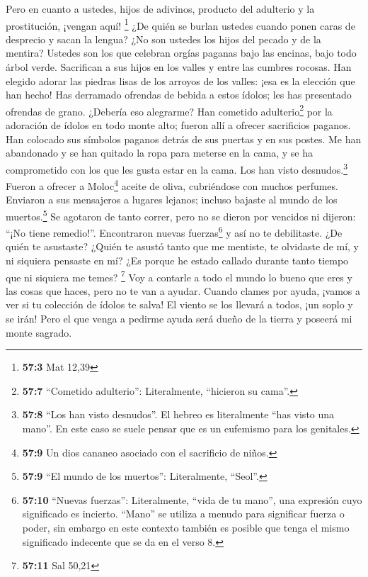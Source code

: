  Pero en cuanto a ustedes, hijos de adivinos, producto del
adulterio y la prostitución, ¡vengan aquí! \footnote{\textbf{57:3} Mat
  12,39}  ¿De quién se burlan ustedes cuando ponen caras
de desprecio y sacan la lengua? ¿No son ustedes los hijos del pecado y
de la mentira?  Ustedes son los que celebran orgías
paganas bajo las encinas, bajo todo árbol verde. Sacrifican a sus hijos
en los valles y entre las cumbres rocosas.  Han elegido
adorar las piedras lisas de los arroyos de los valles: ¡esa es la
elección que han hecho! Has derramado ofrendas de bebida a estos ídolos;
les has presentado ofrendas de grano. ¿Debería eso alegrarme?
 Han cometido adulterio\footnote{\textbf{57:7} ``Cometido
  adulterio'': Literalmente, ``hicieron su cama''.} por la adoración de
ídolos en todo monte alto; fueron allí a ofrecer sacrificios paganos.
 Han colocado sus símbolos paganos detrás de sus puertas y
en sus postes. Me han abandonado y se han quitado la ropa para meterse
en la cama, y se ha comprometido con los que les gusta estar en la cama.
Los han visto desnudos.\footnote{\textbf{57:8} ``Los han visto
  desnudos''. El hebreo es literalmente ``has visto una mano''. En este
  caso se suele pensar que es un eufemismo para los genitales.}
 Fueron a ofrecer a Moloc\footnote{\textbf{57:9} Un dios
  cananeo asociado con el sacrificio de niños.} aceite de oliva,
cubriéndose con muchos perfumes. Enviaron a sus mensajeros a lugares
lejanos; incluso bajaste al mundo de los muertos.\footnote{\textbf{57:9}
  ``El mundo de los muertos'': Literalmente, ``Seol''.} 
Se agotaron de tanto correr, pero no se dieron por vencidos ni dijeron:
``¡No tiene remedio!''. Encontraron nuevas fuerzas\footnote{\textbf{57:10}
  ``Nuevas fuerzas'': Literalmente, ``vida de tu mano'', una expresión
  cuyo significado es incierto. ``Mano'' se utiliza a menudo para
  significar fuerza o poder, sin embargo en este contexto también es
  posible que tenga el mismo significado indecente que se da en el verso
  8.} y así no te debilitaste.  ¿De quién te asustaste?
¿Quién te asustó tanto que me mentiste, te olvidaste de mí, y ni
siquiera pensaste en mí? ¿Es porque he estado callado durante tanto
tiempo que ni siquiera me temes? \footnote{\textbf{57:11} Sal 50,21}
 Voy a contarle a todo el mundo lo bueno que eres y las
cosas que haces, pero no te van a ayudar.  Cuando clames
por ayuda, ¡vamos a ver si tu colección de ídolos te salva! El viento se
los llevará a todos, ¡un soplo y se irán! Pero el que venga a pedirme
ayuda será dueño de la tierra y poseerá mi monte sagrado.

